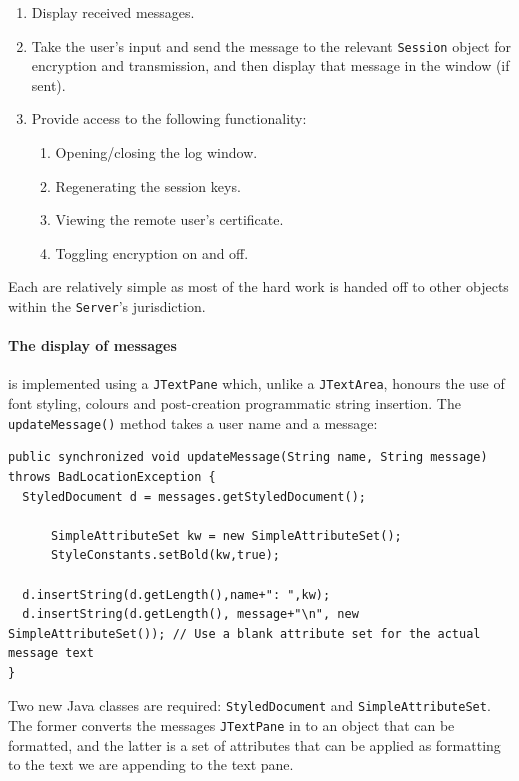     \begin{enumerate}
      \item Display received messages.
      \item Take the user's input and send the message to the relevant \verb!Session! object for encryption and transmission, and then display that message in the window (if sent).
      \item Provide access to the following functionality:
        \begin{enumerate}
          \item Opening/closing the log window.
          \item Regenerating the session keys.
          \item Viewing the remote user's certificate.
          \item Toggling encryption on and off.
        \end{enumerate}
    \end{enumerate}
    
    Each are relatively simple as most of the hard work is handed off to other objects within the \verb!Server!'s jurisdiction. 
    
    \paragraph{The display of messages} is implemented using a \verb!JTextPane! which, unlike a \verb!JTextArea!, honours the use of font styling, colours and post-creation programmatic string insertion. The \verb!updateMessage()! method takes a user name and a message:
    
    \begin{lstlisting}
public synchronized void updateMessage(String name, String message) throws BadLocationException {
  StyledDocument d = messages.getStyledDocument();
      
      SimpleAttributeSet kw = new SimpleAttributeSet();
      StyleConstants.setBold(kw,true);
      
  d.insertString(d.getLength(),name+": ",kw);
  d.insertString(d.getLength(), message+"\n", new SimpleAttributeSet()); // Use a blank attribute set for the actual message text
}
    \end{lstlisting}
    
    Two new Java classes are required: \verb!StyledDocument! and \verb!SimpleAttributeSet!. The former converts the messages \verb!JTextPane! in to an object that can be formatted, and the latter is a set of attributes that can be applied as formatting to the text we are appending to the text pane. 
    
